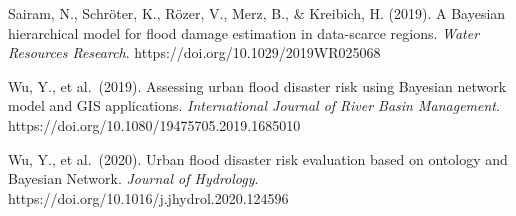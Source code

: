 \documentclass[
]{article}
\begin{document}
Sairam, N., Schröter, K., Rözer, V., Merz, B., \& Kreibich, H. (2019). A
Bayesian hierarchical model for flood damage estimation in data-scarce
regions. \emph{Water Resources Research}.
https://doi.org/10.1029/2019WR025068

Wu, Y., et al.~(2019). Assessing urban flood disaster risk using
Bayesian network model and GIS applications. \emph{International Journal
of River Basin Management}.
https://doi.org/10.1080/19475705.2019.1685010

Wu, Y., et al.~(2020). Urban flood disaster risk evaluation based on
ontology and Bayesian Network. \emph{Journal of Hydrology}.
https://doi.org/10.1016/j.jhydrol.2020.124596
\end{document}
